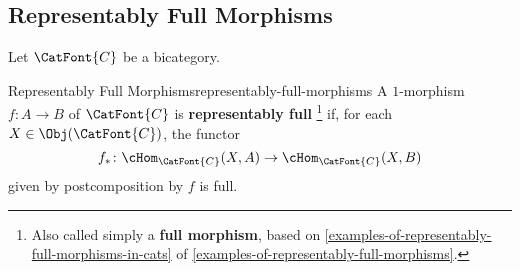 \subsection{Representably Full Morphisms}\label{subsection-full-monomorphisms}
Let $\CatFont{C}$ be a bicategory.
\begin{definition}{Representably Full Morphisms}{representably-full-morphisms}%
    A $1$-morphism $f\colon A\to B$ of $\CatFont{C}$ is \textbf{representably full}%
    \footnote{%
        Also called simply a \textbf{full morphism}, based on \cref{examples-of-representably-full-morphisms-in-cats} of \cref{examples-of-representably-full-morphisms}.
        \par\vspace*{-1.75\baselineskip}
    } %
    if, for each $X\in\Obj(\CatFont{C})$, the functor
    \[
        f_{*}%
        \colon%
        \cHom_{\CatFont{C}}(X,A)%
        \to%
        \cHom_{\CatFont{C}}(X,B)%
    \]%
    given by postcomposition by $f$ is full.
\end{definition}
